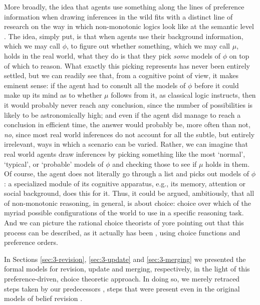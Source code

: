 More broadly, the idea that agents use something along the lines of preference 
information when drawing inferences in the wild fits with a distinct 
line of research on the way in which non-monotonic logics look like at the semantic level
\cite{StrasserA19}.
The idea, simply put, is that when agents use their background information,
which we may call $\phi$, to figure out whether something, which we may call $\mu$, holds
in the real world, 
what they do is that they pick \emph{some} models of $\phi$ on top of which to reason.
What exactly this picking represents has never been entirely settled,
but we can readily see that,
from a cognitive point of view,
it makes eminent sense:
if the agent had to consult all the models of $\phi$ before it could
make up its mind as to whether $\mu$ follows from it,
as classical logic instructs,
then it would probably never reach any conclusion,
since the number of possibilities is likely to be astronomically high;
and even if the agent did manage to reach a conclusion in efficient time,
the answer would probably be, more often than not, \emph{no}, since most real world inferences do not account for all the subtle,
but entirely irrelevant, ways in which a scenario can be varied.
Rather, we can imagine that real world agents draw inferences by 
picking something like 
the most `normal', `typical', or `probable' models of $\phi$
and checking those to see if $\mu$ holds in them.
Of course, the agent does not literally go 
through a list and picks out models of $\phi$: 
a specialized module of its cognitive apparatus, 
e.g., its memory, attention or social background, 
does this for it.
Thus, it could be argued, ambitiously, that all of non-monotonic reasoning,
in general, is about choice: 
choice over which of the myriad possible configurations of the world 
to use in a specific reasoning task.
And we can picture the rational choice theorists of yore 
pointing out that this process can be described,
as it actually has been \cite{Shoham87,Pearl89,KrausLM90},
using choice functions and preference orders.

In Sections \ref{sec:3-revision}, \ref{sec:3-update} and \ref{sec:3-merging}
we presented the formal models for revision, update and merging, respectively,
in the light of this preference-driven, choice theoretic approach.
In doing so, we merely retraced steps 
taken by our predecessors \cite{Rott01,Bonanno09,Arlo-CostaP10,KoniecznyP11},
steps that were present even in the original models of 
belief revision \cite{AlchourronGM85,KatsunoM92}.

